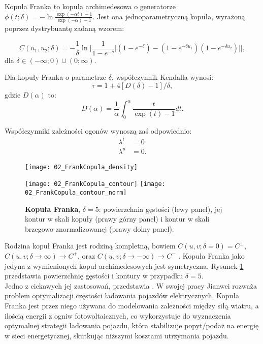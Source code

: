\begin{df}
	Kopuła Franka to kopuła archimedesowa o generatorze $\phi(t;\delta) = -\ln\frac{\exp(-\alpha t) - 1}{\exp(-\alpha)-1}$. Jest ona jednoparametryczną kopuła, wyrażoną poprzez dystrybuantę zadaną wzorem:
	
	$$ C(u_1, u_2; \delta) = -\frac{1}{\delta}\ln\bigg[ \frac{1}{1-e^{-\delta}}\big[(1-e^{-\delta}) - (1-e^{-\delta u_1})(1-e^{-\delta u_2})\big] \bigg],$$
	dla $\delta \in (-\infty; 0) \cup (0; \infty).$
\end{df}
\begin{prop}
	Dla kopuły Franka o parametrze $\delta$, współczynnik Kendalla wynosi:
	$$ \tau = 1 + 4[D(\delta) - 1]/\delta,$$
	gdzie $D(\alpha)$ to:
	$$ D(\alpha) = \frac{1}{\alpha} \int_{0}^{\alpha} \frac{t}{\exp(t) - 1}dt.$$
		
	Współczynniki zależności ogonów wynoszą zaś odpowiednio:
	\begin{equation}
		\begin{split}
			\lambda^{l}&=0\\
			\lambda^{u}&=0.
		\end{split}
	\end{equation}
\end{prop}

\begin{figure}[h]
	\centering
	\begin{minipage}{0.5\linewidth}
		\texttt{[image: 02\_FrankCopula\_density]}
	\end{minipage}
	\begin{minipage}{0.45\linewidth}
		\texttt{[image: 02\_FrankCopula\_contour]}
		\texttt{[image: 02\_FrankCopula\_contour\_norm]}
	\end{minipage}
	\caption{\textbf{Kopuła Franka}, $\delta = 5$: powierzchnia gęstości (lewy panel), jej kontur w skali kopuły (prawy górny panel) i kontur w skali brzegowo-znormalizowanej (prawy dolny panel). \label{fig:frank_copula_density}}
\end{figure}

Rodzina kopuł Franka jest rodziną kompletną, bowiem $C(u,v;\delta = 0) = C^{\perp}$, $C(u,v;\delta \to \infty) \to C^{+}$, oraz $C(u,v;\delta \to -\infty) \to C^{-}$ . Kopuła Franka jako jedyna z wymienionych kopuł archimedesowych jest symetryczna. Rysunek \ref{fig:frank_copula_density} przedstawia powierzchnię gęstości i kontury w przypadku $\delta = 5$. \\
Jedno z ciekawych jej zastosowań, przedstawia \cite{Jianwei2021}. W swojej pracy Jianwei rozważa problem optymalizacji częstości ładowania pojazdów elektrycznych. Kopuła Franka jest przez niego używana do modelowania zależności między siłą wiatru, a ilością energii z ogniw fotowoltaicznych, co wykorzystuje do wyznaczenia optymalnej strategii ładowania pojazdu, która stabilizuje popyt/podaż na energię w sieci energetycznej, skutkując niższymi kosztami utrzymania pojazdu. 

